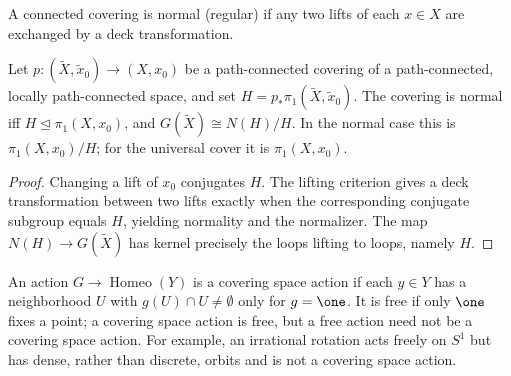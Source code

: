 \begin{definition}
\label{def:normal-covering-space}
\leanok
{}
A connected covering is normal (regular) if any two lifts of each $x\in X$
are exchanged by a deck transformation.
\end{definition}

\begin{proposition}
\label{prop:normal-covering-deck-group}
\leanok
{}
Let $p:(\widetilde X,\widetilde x_0)\to(X,x_0)$ be a path-connected covering
of a path-connected, locally path-connected space, and set
$H=p_*\pi_1(\widetilde X,\widetilde x_0)$. The covering is normal iff
$H\trianglelefteq\pi_1(X,x_0)$, and
$G(\widetilde X)\cong N(H)/H$. In the normal case this is
$\pi_1(X,x_0)/H$; for the universal cover it is $\pi_1(X,x_0)$.
\end{proposition}

\begin{proof}
\leanok
\sketch Changing a lift of $x_0$ conjugates $H$. The lifting criterion gives
a deck transformation between two lifts exactly when the corresponding
conjugate subgroup equals $H$, yielding normality and the normalizer. The map
$N(H)\to G(\widetilde X)$ has kernel precisely the loops lifting to loops,
namely $H$.
\end{proof}

\begin{definition}
\label{def:group-action}
\leanok
{}
An action $G\to\operatorname{Homeo}(Y)$ is a covering space action if each
$y\in Y$ has a neighborhood $U$ with $g(U)\cap U\neq\emptyset$ only for
$g=\one$. It is free if only $\one$ fixes a point; a covering space action is
free, but a free action need not be a covering space action. For example, an
irrational rotation acts freely on $S^1$ but has dense, rather than discrete,
orbits and is not a covering space action.
\end{definition}

